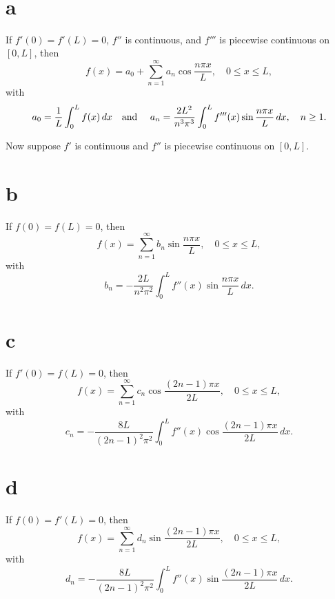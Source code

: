 \setcounter{theorem}{4}
\setcounter{equation}{2}
\begin{theorem}
  \label{thmtype:11.3.5} \mbox{}\\

\part{a} If $f'(0)=f'(L)=0$, $f''$ is continuous, and $f'''$ is piecewise continuous on $[0,L]$,
then
  \begin{equation}
    \label{eq:11.3.3}f(x)=a_{0}+\sum_{n=1}^{\infty}a_{n}\cos\frac{n\pi x}{L}, \quad0\le x\le L,
  \end{equation}
  with
  \begin{equation}
    \label{eq:11.3.4}a_{0}=\frac{1}{L}\int_{0}^{L}f(x)\,dx\mbox{\quad and \quad}a_{n}=\frac{2L^{2}}{n^{3}\pi^{3}}\int_{0}^{L}f'''(x)\sin\frac{n\pi x}{L}\,dx, \quad n\ge1.
  \end{equation}

  Now suppose $f'$ is continuous and $f''$ is piecewise continuous on $[0,L]$.

\part{b} If $f(0)=f(L)=0$, then
  \[
    f(x)=\sum_{n=1}^{\infty}b_{n}\sin\frac{n\pi x}{L}, \quad0\le x\le L,
  \]
  with
  \begin{equation}
    \label{eq:11.3.5}b_{n}=-\frac{2L}{n^{2}\pi^{2}}\int_{0}^{L}f''(x)\sin\frac{n\pi x}{L}\,dx.
  \end{equation}

\part{c} If $f'(0)=f(L)=0$, then
  \[
    f(x)= \sum_{n=1}^{\infty}c_{n}\cos\frac{(2n-1)\pi x}{2L}, \quad0\le x\le L,
  \]
  with
  \begin{equation}
    \label{eq:11.3.6}c_{n}=-\frac{8L}{(2n-1)^{2}\pi^{2}}\int_{0}^{L}f''(x)\cos\frac{(2n-1)\pi x}{2L}\,dx.
  \end{equation}

\part{d} If $f(0)=f'(L)=0$, then
  \[
    f(x)= \sum_{n=1}^{\infty}d_{n}\sin\frac{(2n-1)\pi x}{2L}, \quad0\le x\le L,
  \]
  with
  \begin{equation}
    \label{eq:11.3.7}d_{n}=-\frac{8L}{(2n-1)^{2}\pi^{2}}\int_{0}^{L}f''(x)\sin\frac{(2n-1)\pi x}{2L}\,dx.
  \end{equation}
\end{theorem}

